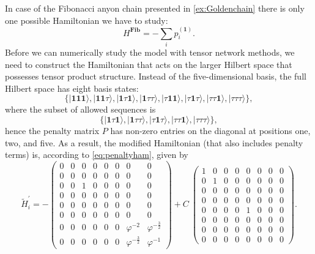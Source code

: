\begin{exmp}
	\label{ex:Goldenchainnumerics}
	In case of the Fibonacci anyon chain presented in \cref{ex:Goldenchain} there is only one possible Hamiltonian we have to study:
	\begin{equation}
	H^\mathbf{Fib}=-\sum_i p_i^{(\mathbf{1})}.
	\end{equation}
	Before we can numerically study the model with tensor network methods, we need to construct the Hamiltonian that acts on the larger Hilbert space that possesses tensor product structure. Instead of the five-dimensional basis, the full Hilbert space has eight basis states:
	\begin{equation}
	\{|\mathbf{1}\mathbf{1}\mathbf{1}\rangle,|\mathbf{1}\mathbf{1}\tau\rangle,|\mathbf{1}\tau\mathbf{1}\rangle,|\mathbf{1}\tau\tau\rangle,|\tau\mathbf{1}\mathbf{1}\rangle,|\tau\mathbf{1}\tau\rangle,|\tau\tau\mathbf{1}\rangle,|\tau\tau\tau\rangle\},
	\end{equation}
	where the subset of allowed sequences is
		\begin{equation}
			\{|\mathbf{1}\tau\mathbf{1}\rangle,|\mathbf{1}\tau\tau\rangle,|\tau\mathbf{1}\tau\rangle,|\tau\tau\mathbf{1}\rangle,|\tau\tau\tau\rangle\},
		\end{equation} 
	hence the penalty matrix $P$ has non-zero entries on the diagonal at positions one, two, and five. As a result, the modified Hamiltonian (that also includes penalty terms) is, according to \cref{eq:penaltyham}, given by 
	\begin{equation}
	\tilde{H}^\prime_i=-\begin{pmatrix}
	0 & 0 & 0 & 0 & 0 & 0 & 0 & 0\\
	0 & 0 & 0 & 0 & 0 & 0 & 0 & 0\\
	0 & 0 & 1 & 0 & 0 & 0 & 0 & 0\\
	0 & 0 & 0 & 0 & 0 & 0 & 0 & 0\\
	0 & 0 & 0 & 0 & 0 & 0 & 0 & 0\\
	0 & 0 & 0 & 0 & 0 & 0 & 0 & 0\\
	0 & 0 & 0 & 0 & 0 & 0 & \varphi^{-2} & \varphi^{-\frac{3}{2}}\\
	0 & 0 & 0 & 0 & 0 & 0 & \varphi^{-\frac{3}{2}} & \varphi^{-1} 
	\end{pmatrix}+C\ \begin{pmatrix}
	1 & 0 & 0 & 0 & 0 & 0 & 0 & 0\\
	0 & 1 & 0 & 0 & 0 & 0 & 0 & 0\\
	0 & 0 & 0 & 0 & 0 & 0 & 0 & 0\\
	0 & 0 & 0 & 0 & 0 & 0 & 0 & 0\\
	0 & 0 & 0 & 0 & 1 & 0 & 0 & 0\\
	0 & 0 & 0 & 0 & 0 & 0 & 0 & 0\\
	0 & 0 & 0 & 0 & 0 & 0 & 0 & 0\\
	0 & 0 & 0 & 0 & 0 & 0 & 0 & 0
	\end{pmatrix}.
	\end{equation}
	

\end{exmp}
